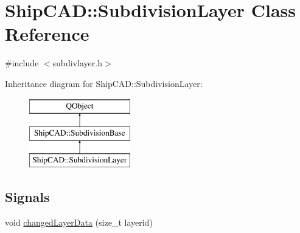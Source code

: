 \hypertarget{classShipCAD_1_1SubdivisionLayer}{\section{Ship\-C\-A\-D\-:\-:Subdivision\-Layer Class Reference}
\label{classShipCAD_1_1SubdivisionLayer}
}


{\ttfamily \#include $<$subdivlayer.\-h$>$}

Inheritance diagram for Ship\-C\-A\-D\-:\-:Subdivision\-Layer\-:\begin{figure}[H]
\begin{center}
\leavevmode
\includegraphics[height=3.000000cm]{classShipCAD_1_1SubdivisionLayer}
\end{center}
\end{figure}
\subsection*{Signals}
\begin{DoxyCompactItemize}
\item 
void \hyperlink{classShipCAD_1_1SubdivisionLayer_ad36ec152981983b8a4dc87df39071418}{changed\-Layer\-Data} (size\-\_\-t layerid)
\end{DoxyCompactItemize}
